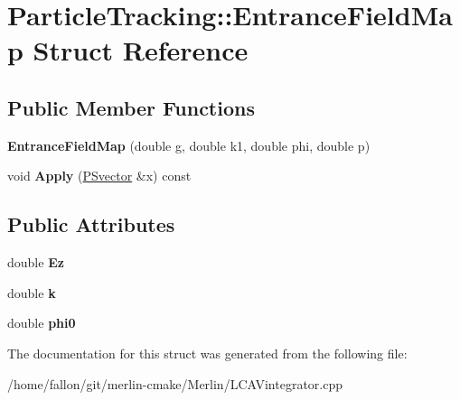 \hypertarget{structParticleTracking_1_1EntranceFieldMap}{}\section{Particle\+Tracking\+:\+:Entrance\+Field\+Map Struct Reference}
\label{structParticleTracking_1_1EntranceFieldMap}
\subsection*{Public Member Functions}
\begin{DoxyCompactItemize}
\item 
\mbox{\label{structParticleTracking_1_1EntranceFieldMap_a9bbb025daf384a35167f060d00918893}} 
{\bfseries Entrance\+Field\+Map} (double g, double k1, double phi, double p)
\item 
\mbox{\label{structParticleTracking_1_1EntranceFieldMap_a85b93a634827560603afa79795c262f2}} 
void {\bfseries Apply} (\hyperlink{classPSvector}{P\+Svector} \&x) const
\end{DoxyCompactItemize}
\subsection*{Public Attributes}
\begin{DoxyCompactItemize}
\item 
\mbox{\label{structParticleTracking_1_1EntranceFieldMap_afaa52be65c093140b48d6a20cca6294e}} 
double {\bfseries Ez}
\item 
\mbox{\label{structParticleTracking_1_1EntranceFieldMap_a8059d5ce1deb0e569b5ee460d5f1e069}} 
double {\bfseries k}
\item 
\mbox{\label{structParticleTracking_1_1EntranceFieldMap_af0073cd8216638404b7eb59bda91e336}} 
double {\bfseries phi0}
\end{DoxyCompactItemize}


The documentation for this struct was generated from the following file\+:\begin{DoxyCompactItemize}
\item 
/home/fallon/git/merlin-\/cmake/\+Merlin/L\+C\+A\+Vintegrator.\+cpp\end{DoxyCompactItemize}

